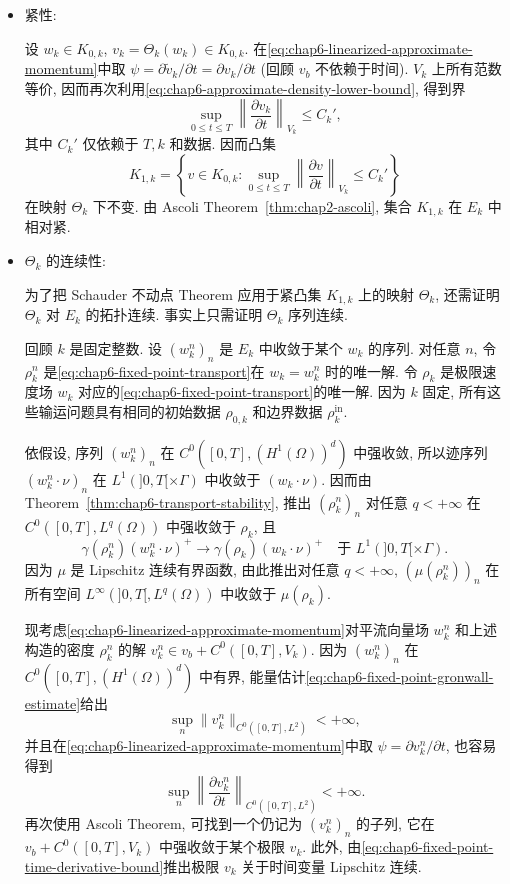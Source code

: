 \begin{sloppypar}
\begin{itemize}
 \item 紧性:

 设 $w_k\in K_{0,k}$, $v_k=\Theta_k(w_k)\in K_{0,k}$. 在\eqref{eq:chap6-linearized-approximate-momentum}中取
 $\psi=\partial\widetilde v_k/\partial t=\partial v_k/\partial t$ (回顾 $v_b$ 不依赖于时间). $V_k$ 上所有范数等价, 因而再次利用\eqref{eq:chap6-approximate-density-lower-bound}, 得到界
 \[
  \sup_{0\leq t\leq T}
  \left\|\frac{\partial v_k}{\partial t}\right\|_{V_k}\leq C_k',
 \]
 其中 $C_k'$ 仅依赖于 $T,k$ 和数据. 因而凸集
 \[
  K_{1,k}=\left\{v\in K_{0,k}:
  \sup_{0\leq t\leq T}\left\|\frac{\partial v}{\partial t}\right\|_{V_k}\leq C_k'\right\}
 \]
 在映射 $\Theta_k$ 下不变. 由 Ascoli Theorem~\ref{thm:chap2-ascoli}, 集合 $K_{1,k}$ 在 $E_k$ 中相对紧.

 \item $\Theta_k$ 的连续性:

 为了把 Schauder 不动点 Theorem 应用于紧凸集 $K_{1,k}$ 上的映射 $\Theta_k$, 还需证明 $\Theta_k$ 对 $E_k$ 的拓扑连续. 事实上只需证明 $\Theta_k$ 序列连续.

 回顾 $k$ 是固定整数. 设 $(w_k^n)_n$ 是 $E_k$ 中收敛于某个 $w_k$ 的序列. 对任意 $n$, 令 $\rho_k^n$ 是\eqref{eq:chap6-fixed-point-transport}在 $w_k=w_k^n$ 时的唯一解. 令 $\rho_k$ 是极限速度场 $w_k$ 对应的\eqref{eq:chap6-fixed-point-transport}的唯一解. 因为 $k$ 固定, 所有这些输运问题具有相同的初始数据 $\rho_{0,k}$ 和边界数据 $\rho_k^{\mathrm{in}}$.

 依假设, 序列 $(w_k^n)_n$ 在 $C^0([0,T],(H^1(\Omega))^d)$ 中强收敛, 所以迹序列 $(w_k^n\cdot\nu)_n$ 在 $L^1(]0,T[\times\Gamma)$ 中收敛于 $(w_k\cdot\nu)$. 因而由 Theorem~\ref{thm:chap6-transport-stability}, 推出 $(\rho_k^n)_n$ 对任意 $q<+\infty$ 在 $C^0([0,T],L^q(\Omega))$ 中强收敛于 $\rho_k$, 且
 \[
  \gamma(\rho_k^n)(w_k^n\cdot\nu)^+
  \longrightarrow\gamma(\rho_k)(w_k\cdot\nu)^+
  \quad\text{于 }L^1(]0,T[\times\Gamma).
 \]
 因为 $\mu$ 是 Lipschitz 连续有界函数, 由此推出对任意 $q<+\infty$, $(\mu(\rho_k^n))_n$ 在所有空间 $L^\infty(]0,T[,L^q(\Omega))$ 中收敛于 $\mu(\rho_k)$.

 现考虑\eqref{eq:chap6-linearized-approximate-momentum}对平流向量场 $w_k^n$ 和上述构造的密度 $\rho_k^n$ 的解
 $v_k^n\in v_b+C^0([0,T],V_k)$. 因为 $(w_k^n)_n$ 在 $C^0([0,T],(H^1(\Omega))^d)$ 中有界, 能量估计\eqref{eq:chap6-fixed-point-gronwall-estimate}给出
 \[
  \sup_n\|v_k^n\|_{C^0([0,T],L^2)}<+\infty,
 \]
并且在\eqref{eq:chap6-linearized-approximate-momentum}中取 $\psi=\partial v_k^n/\partial t$, 也容易得到
 \begin{equation}
  \sup_n\left\|\frac{\partial v_k^n}{\partial t}\right\|_{C^0([0,T],L^2)}<+\infty.
 \label{eq:chap6-fixed-point-time-derivative-bound}
 \end{equation}
 再次使用 Ascoli Theorem, 可找到一个仍记为 $(v_k^n)_n$ 的子列, 它在 $v_b+C^0([0,T],V_k)$ 中强收敛于某个极限 $v_k$. 此外, 由\eqref{eq:chap6-fixed-point-time-derivative-bound}推出极限 $v_k$ 关于时间变量 Lipschitz 连续.


\end{itemize}
\end{sloppypar}
